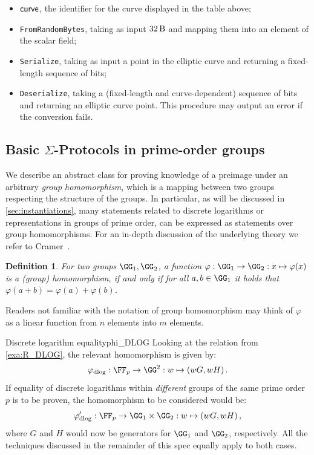 \documentclass[11pt]{article}
\newtheorem{definition}{Definition}
\begin{document}
\begin{itemize}
  \item $\textsf{curve}$, the identifier for the curve displayed in the table above;
  \item \texttt{FromRandomBytes}, taking as input $\seedlen$ and mapping them into an element of the scalar field;
  \item \texttt{Serialize}, taking as input a point in the elliptic curve and returning a fixed-length sequence of bits;
  \item \texttt{Deserialize}, taking a (fixed-length and curve-dependent) sequence of bits and returning an elliptic curve point. This procedure may output an error if the conversion fails.
\end{itemize}


\subsection{Basic $\Sigma$-Protocols in prime-order groups}\label{sec:basic_sigma}
  We describe an abstract class for proving knowledge of a preimage under an arbitrary \emph{group homomorphism}, which is a mapping between two groups respecting the structure of the groups.
In particular, as will be discussed in \cref{sec:instantiations}, many statements related to discrete logarithms or representations in groups of prime order, can be expressed as statements over group homomorphisms.
For an in-depth discussion of the underlying theory we refer to Cramer~\cite{cramer97}.

\begin{definition}
  For two groups $\GG_1,\GG_2$, a function $\varphi:\GG_1\to\GG_2:x\mapsto\varphi(x)$ is a \emph{(group) homomorphism}, if and only if for all $a,b\in\GG_1$ it holds that $\varphi(a+b)=\varphi(a)+\varphi(b)$.
\end{definition}
Readers not familiar with the notation of group homomorphism may think of $\varphi$ as a linear function from $n$ elements into $m$ elements.

\begin{example}{Discrete logarithm equality}{phi_DLOG}
  Looking at the relation from \cref{exa:R_DLOG}, the relevant homomorphism is given by:
	$$
	  \varphi_{\operatorname{dlog}} : \FF_p\to\GG^2 : \witness\mapsto (\witness G,\witness H)\,.
	$$
	If equality of discrete logarithms within \emph{different} groups of the same prime order $p$ is to be proven, the homomorphism to be considered would be:
	$$
	  \varphi_{\operatorname{dlog}}' : \FF_p\to\GG_1\times\GG_2 : \witness\mapsto (\witness G,\witness H)\,,
	$$
	where $G$ and $H$ would now be generators for $\GG_1$ and $\GG_2$, respectively.
	All the techniques discussed in the remainder of this spec equally apply to both cases.
\end{example}
\end{document}
